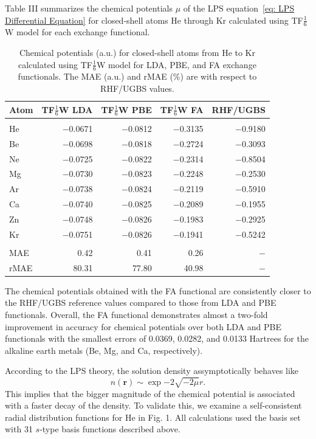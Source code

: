 \documentclass[%
 reprint,
 amsmath,amssymb,
 aps,
pra,
]{revtex4-2}
\begin{document}
Table III summarizes the chemical potentials $\mu$ of the LPS equation~\eqref{eq: LPS Differential Equation} for closed-shell atoms He through Kr calculated using TF$\frac{1}{6}$W model for each exchange functional.  
\begin{table}[htb]
\caption{Chemical potentials (a.u.) for closed-shell atoms from He to Kr calculated using TF$\frac{1}{6}$W model for LDA, PBE, and FA exchange functionals. The MAE (a.u.) and rMAE (\%) are with respect to RHF/UGBS values.}
\begin{ruledtabular}
\begin{tabular}{lrrrr}
Atom & TF$\frac{1}{6}$W LDA & TF$\frac{1}{6}$W PBE & TF$\frac{1}{6}$W FA & RHF/UGBS \\[2pt]
\hline\\[-9pt]
He    & $-$0.0671   & $-$0.0812   & $-$0.3135   & $-$0.9180   \\[1.5pt]
Be    & $-$0.0698   & $-$0.0818   & $-$0.2724   & $-$0.3093   \\[1.5pt]
Ne    & $-$0.0725   & $-$0.0822   & $-$0.2314   & $-$0.8504   \\[1.5pt]
Mg    & $-$0.0730   & $-$0.0823   & $-$0.2248   & $-$0.2530   \\[1.5pt]
Ar    & $-$0.0738   & $-$0.0824   & $-$0.2119   & $-$0.5910   \\[1.5pt]
Ca    & $-$0.0740   & $-$0.0825   & $-$0.2089   & $-$0.1955   \\[1.5pt]
Zn    & $-$0.0748   & $-$0.0826   & $-$0.1983   & $-$0.2925   \\[1.5pt]
Kr    & $-$0.0751   & $-$0.0826   & $-$0.1941   & $-$0.5242   \\[1.5pt]
\hline\\[-9pt]
MAE & 0.42 & 0.41 & 0.26 & $-$\\[1.5pt]
rMAE & 80.31 & 77.80 & 40.98 & $-$\\
\end{tabular}
\end{ruledtabular}
\end{table}

The chemical potentials obtained with the FA functional are consistently closer to the RHF/UGBS reference values compared to those from LDA and PBE functionals. Overall, the FA functional demonstrates almost a two-fold improvement in accuracy for chemical potentials over both LDA and PBE functionals with the smallest errors of 0.0369, 0.0282, and 0.0133 Hartrees for the alkaline earth metals (Be, Mg, and Ca, respectively). 

According to the LPS theory, the solution density assymptotically behaves like 
\begin{equation}\label{eq: Density Asymptotics}
    n(\textbf{r})
    \sim
    \exp{-2\sqrt{-2\mu}r}.
\end{equation}
This implies that the bigger magnitude of the chemical potential is associated with a faster decay of the density. To validate this, we examine a self-consistent radial distribution functions for He in Fig. 1. All calculations used the basis set with 31 $s$-type basis functions described above. 
\end{document}
